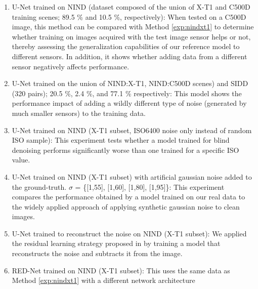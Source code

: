 \begin{enumerate}
\itemsep0em 
\setcounter{enumi}{3}
  \item\label{exp:nindall}   U-Net trained on \ac{NIND} (dataset composed of the union of \ac{X-T1} and \ac{C500D} training scenes; 89.5 \% and 10.5 \%, respectively):\newline
  When tested on a \ac{C500D} image, this method can be compared with Method \ref{exp:nindxt1} to determine whether training on images acquired with the test image sensor helps or not, thereby assessing the generalization capabilities of our reference model to different sensors.  In addition, it shows whether adding data from a different sensor negatively affects performance.
  \item\label{exp:nindsidd} U-Net trained on the union of \ac{NIND}:\ac{X-T1}, \ac{NIND}:\ac{C500D} scenes) and \ac{SIDD} (320 pairs); 20.5 \%, 2.4 \%, and 77.1 \% respectively:\newline
  This model shows the performance impact of adding a wildly different type of noise (generated by much smaller sensors) to the training data.
  \item\label{exp:nind6400} U-Net trained on \ac{NIND} (\ac{X-T1} subset, ISO6400 noise only instead of random ISO sample):\newline
  This experiment tests whether a model trained for blind denoising performs significantly worse than one trained for a specific ISO value.
  \item\label{exp:nindart} U-Net trained on \ac{NIND} (\ac{X-T1} subset) with artificial gaussian noise added to the ground-truth. $\sigma$ = \{[1,55], [1,60], [1,80], [1,95]\}:\newline
  This experiment compares the performance obtained by a model trained on our real data to the widely applied approach of applying synthetic gaussian noise to clean images.
  \item\label{exp:nindmakenoise} U-Net trained to reconstruct the noise on \ac{NIND} (\ac{X-T1} subset):\newline
  We applied the residual learning strategy proposed in \cite{dncnn} by training a model that reconstructs the noise and subtracts it from the image.
  \item\label{exp:nindred} \ac{RED-Net} \cite{rednet} trained on \ac{NIND} (\ac{X-T1} subset):\newline
  This uses the same data as Method \ref{exp:nindxt1} with a different network architecture

\end{enumerate}


